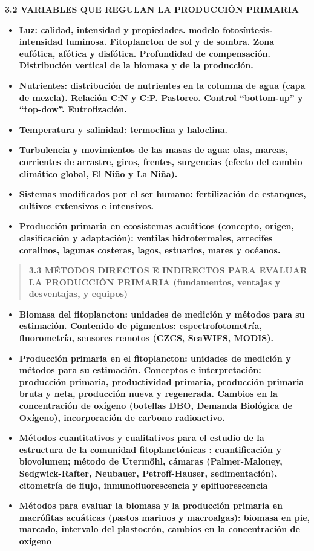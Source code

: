 \documentclass[
]{article}
\begin{document}
\textbf{3.2 VARIABLES QUE REGULAN LA PRODUCCIÓN PRIMARIA}

\begin{itemize}
\item
  \textbf{Luz: calidad, intensidad y propiedades. modelo
  fotosíntesis-intensidad luminosa. Fitoplancton de sol y de sombra.
  Zona eufótica, afótica y disfótica. Profundidad de compensación.
  Distribución vertical de la biomasa y de la producción.}
\item
  \textbf{Nutrientes: distribución de nutrientes en la columna de agua
  (capa de mezcla). Relación C:N y C:P. Pastoreo. Control ``bottom-up''
  y ``top-dow''. Eutrofización.}
\item
  \textbf{Temperatura y salinidad: termoclina y haloclina.}
\item
  \textbf{Turbulencia y movimientos de las masas de agua: olas, mareas,
  corrientes de arrastre, giros, frentes, surgencias (efecto del cambio
  climático global, El Niño y La Niña).}
\item
  \textbf{Sistemas modificados por el ser humano: fertilización de
  estanques, cultivos extensivos e intensivos.}
\item
  \textbf{Producción primaria en ecosistemas acuáticos (concepto,
  origen, clasificación y adaptación): ventilas hidrotermales, arrecifes
  coralinos, lagunas costeras, lagos, estuarios, mares y océanos.}
\end{itemize}

\begin{quote}
\textbf{3.3 MÉTODOS DIRECTOS E INDIRECTOS PARA EVALUAR LA PRODUCCIÓN
PRIMARIA (fundamentos, ventajas y desventajas, y equipos)}
\end{quote}

\begin{itemize}
\item
  \textbf{Biomasa del fitoplancton: unidades de medición y métodos para
  su estimación. Contenido de pigmentos: espectrofotometría,
  fluorometría, sensores remotos (CZCS, SeaWIFS, MODIS).}
\item
  \textbf{Producción primaria en el fitoplancton: unidades de medición y
  métodos para su estimación. Conceptos e interpretación: producción
  primaria, productividad primaria, producción primaria bruta y neta,
  producción nueva y regenerada. Cambios en la concentración de oxígeno
  (botellas DBO, Demanda Biológica de Oxígeno), incorporación de carbono
  radioactivo.}
\item
  \textbf{Métodos cuantitativos y cualitativos para el estudio de la
  estructura de la comunidad fitoplanctónicas : cuantificación y
  biovolumen; método de Utermöhl, cámaras (Palmer-Maloney,
  Sedgwick-Rafter, Neubauer, Petroff-Hauser, sedimentación), citometría
  de flujo, inmunofluorescencia y epifluorescencia}
\item
  \textbf{Métodos para evaluar la biomasa y la producción primaria en
  macrófitas acuáticas (pastos marinos y macroalgas): biomasa en pie,
  marcado, intervalo del plastocrón, cambios en la concentración de
  oxígeno}
\end{itemize}
\end{document}
